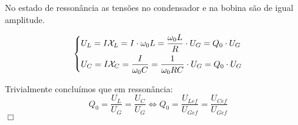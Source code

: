 No estado de ressonância as tensões no condensador e na bobina são de igual amplitude.

$$
\begin{dcases*}
U_L = I \mathcal{X}_L = I\cdot \omega_0 L = \frac{\omega_0 L}{R}\cdot U_G = Q_0\cdot U_G\\
U_C = I \mathcal{X}_C = \frac{I}{\omega_0 C} = \frac{1}{\omega_0 RC}\cdot U_G = Q_0\cdot U_G
\end{dcases*}
$$

Trivialmente concluímos que em ressonância: 
$$ 
Q_0 = \dfrac{U_L}{U_G} = \dfrac{U_C}{U_G} \iff Q_0 = \dfrac{U_{Lef}}{U_{Gef}} = \dfrac{U_{Cef}}{U_{Gef}}
$$
\hfill \ensuremath{\Box}
